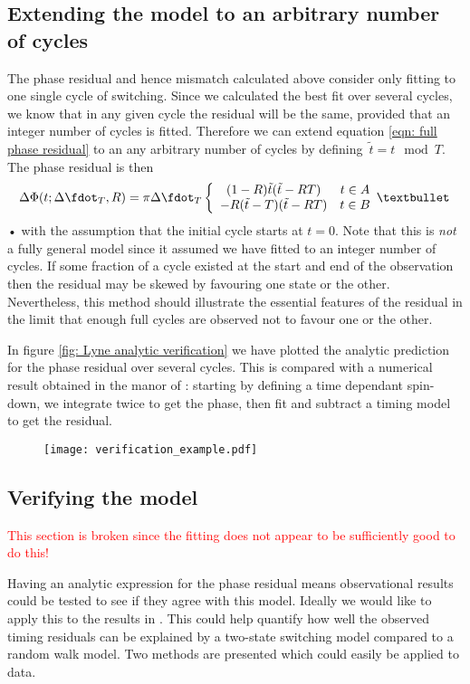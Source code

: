 \documentclass[/home/greg/Thesis/main/main.tex]{subfiles}
\begin{document}
\subsection{Extending the model to an arbitrary number of cycles} The phase
residual and hence mismatch calculated above consider only fitting to 
one single cycle of switching.  Since we calculated the best fit over several cycles, we know that
in any given cycle the residual will be the same, provided that an integer number
of cycles is fitted. Therefore we can extend equation
\eqref{eqn: full phase residual}
to an any arbitrary number of cycles by
defining~$\tilde{t}= t \mod T$. The phase residual is then 
\begin{equation} 
    \Delta\Phi(t; \Delta\fdot_{T}, R) = \pi\Delta\fdot_{T}\two{
        (1-R)\tilde{t}(\tilde{t}-RT)
         }
        {
        -R(\tilde{t}-T)(\tilde{t}-RT)
        }
\label{eqn: arbitary full phase residual}
\end{equation}•
with the assumption that the initial cycle starts at $t=0$. 
Note that this is \emph{not} a fully general model since it assumed we have
fitted to an integer number of cycles. If some fraction of a cycle existed
at the start and end of the observation then the residual may be skewed by
favouring one state or the other. Nevertheless, this method should illustrate
the essential features of the residual in the limit that enough full cycles
are observed not to favour one or the other.

In figure \ref{fig: Lyne analytic verification} we have plotted the analytic 
prediction for the phase residual over several cycles. This is compared with
a numerical result obtained in the manor of \citet{Lyne2010}: starting by defining
a time dependant spin-down, we integrate twice to get the phase, then fit and
subtract a timing model to get the residual. 
\begin{figure}[ht]
    \centering
    \texttt{[image: verification\_example.pdf]}
    \caption{}
    \label{fig: Phase residual}
\end{figure}

\FloatBarrier
\subsection{Verifying the model}

\textcolor{red}{This section is broken since the fitting does not appear to be
sufficiently good to do this!}

Having an analytic expression for the phase residual means observational results
could be tested to see if they agree with this model. Ideally we would like to
apply this to the results in \citet{Lyne2010}. This could help quantify how
well the observed timing residuals can be explained by a two-state switching model
compared to a random walk model. Two methods are presented which could easily
be applied to data.
\end{document}

